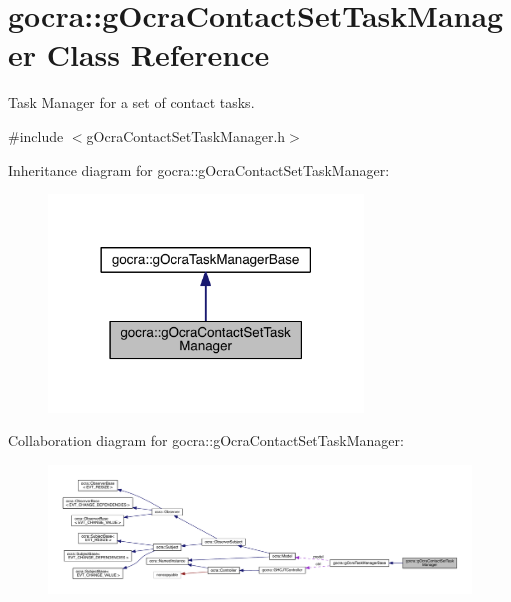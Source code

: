 \hypertarget{classgocra_1_1gOcraContactSetTaskManager}{}\section{gocra\+:\+:g\+Ocra\+Contact\+Set\+Task\+Manager Class Reference}
\label{classgocra_1_1gOcraContactSetTaskManager}


Task Manager for a set of contact tasks.  




{\ttfamily \#include $<$g\+Ocra\+Contact\+Set\+Task\+Manager.\+h$>$}



Inheritance diagram for gocra\+:\+:g\+Ocra\+Contact\+Set\+Task\+Manager\+:\nopagebreak
\begin{figure}[H]
\begin{center}
\leavevmode
\includegraphics[width=237pt]{d7/d57/classgocra_1_1gOcraContactSetTaskManager__inherit__graph}
\end{center}
\end{figure}


Collaboration diagram for gocra\+:\+:g\+Ocra\+Contact\+Set\+Task\+Manager\+:
\nopagebreak
\begin{figure}[H]
\begin{center}
\leavevmode
\includegraphics[width=350pt]{d7/d15/classgocra_1_1gOcraContactSetTaskManager__coll__graph}
\end{center}
\end{figure}

